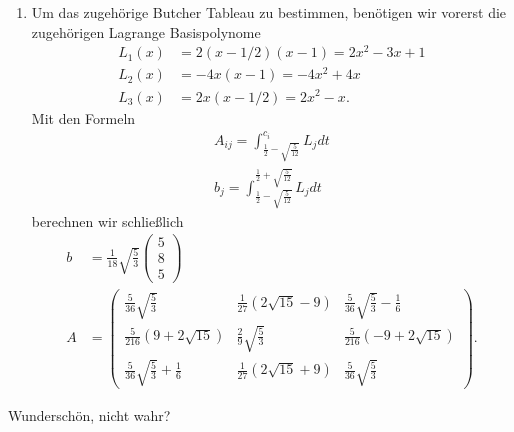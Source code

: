 \begin{solution}
\begin{enumerate}[label = \textbf{\alph*)}]
  \item Um das zugehörige Butcher Tableau zu bestimmen, benötigen wir vorerst die
  zugehörigen Lagrange Basispolynome
  \begin{align*}
    L_1(x) &= 2(x - 1/2)(x - 1) = 2x^2 - 3x + 1\\
    L_2(x) &= -4x(x - 1) = -4x^2 + 4x\\
    L_3(x) &= 2x(x - 1/2) = 2x^2 - x.
  \end{align*}
  Mit den Formeln
  \begin{align*}
    A_{ij} = \int_{\frac{1}{2} - \sqrt{\frac{5}{12}}}^{c_i} L_j dt \\
    b_j = \int_{\frac{1}{2} - \sqrt{\frac{5}{12}}}^{\frac{1}{2} + \sqrt{\frac{5}{12}}} L_j dt
  \end{align*}
  berechnen wir schließlich
  \begin{align*}
    b &= \frac{1}{18}\sqrt{\frac{5}{3}}
    \begin{pmatrix}
       5 \\ 8 \\ 5
    \end{pmatrix}\\
    A &=
     \begin{pmatrix}
      \frac{5}{36}\sqrt{\frac{5}{3}} & \frac{1}{27}\left(2\sqrt{15} - 9\right)
      & \frac{5}{36}\sqrt{\frac{5}{3}} - \frac{1}{6}\\
      \frac{5}{216}\left(9 + 2\sqrt{15}\right) & \frac{2}{9}\sqrt{\frac{5}{3}}
      & \frac{5}{216}\left(-9 + 2\sqrt{15}\right)\\
      \frac{5}{36}\sqrt{\frac{5}{3}} + \frac{1}{6} & \frac{1}{27}\left(2\sqrt{15} + 9\right)
      & \frac{5}{36}\sqrt{\frac{5}{3}}
    \end{pmatrix}.
  \end{align*}
\end{enumerate}
Wunderschön, nicht wahr?
\end{solution}
